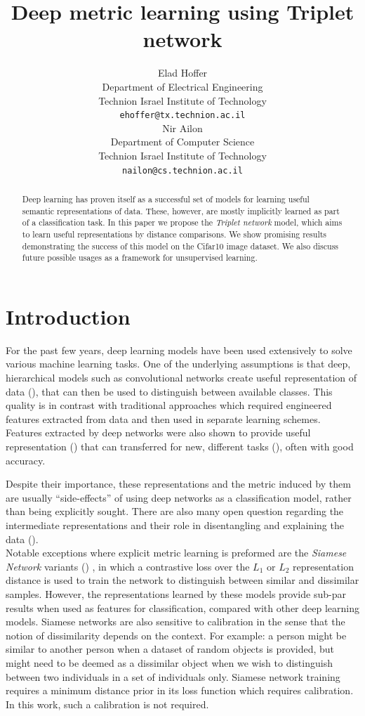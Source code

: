 \documentclass{article} %
\title{Deep metric learning using Triplet network}
\author{
Elad Hoffer \\
Department of Electrical Engineering\\
Technion Israel Institute of Technology\\
\texttt{ehoffer@tx.technion.ac.il} \\
\And
Nir Ailon \\
Department of Computer Science\\
Technion Israel Institute of Technology\\
\texttt{nailon@cs.technion.ac.il}
}
\begin{document}
\maketitle

\begin{abstract}
Deep learning has proven itself as a successful set of models for learning useful semantic representations of data. These, however, are mostly implicitly learned as part of a classification task.
In this paper we propose the \emph{Triplet network} model, which aims to learn useful representations by distance comparisons. We show promising results demonstrating the
success of this model on the Cifar10 image dataset. We also discuss future possible usages as a framework for unsupervised learning.
\end{abstract}


\section{Introduction}
For the past few years, deep learning models have been used extensively to solve various machine learning tasks. One of the underlying assumptions is that deep, hierarchical models such as convolutional networks
create useful representation of data (\citet{Bengio2009,Hinton2007}), that can then be used to distinguish between available classes.
This quality is in contrast with traditional approaches which required engineered features extracted from data and then used in separate learning schemes.\\
Features extracted by deep networks were also shown to provide useful representation (\citet{Zeiler2013,Sermanet}) that can transferred for new, different tasks (\citet{Razavian2014}), often with good accuracy.

Despite their importance, these representations and the metric induced by them are usually ``side-effects'' of using deep networks as a classification model, rather than being explicitly sought.
There are also many open question regarding the intermediate representations and their role in disentangling and explaining the data (\citet{Bengio2013}).\\
Notable exceptions where explicit metric learning is preformed are the \emph{Siamese Network} variants (\citet{bromley1993signature,Chopra2005,hadsell2006dimensionality})
, in which a contrastive loss over the $L_1$ or $L_2$ representation distance is used to train the network to distinguish between similar and dissimilar samples.
However, the representations learned by these models provide sub-par results when used as features for classification, compared with other deep learning models. Siamese networks are also sensitive to calibration in the sense that the notion of dissimilarity depends on the context.
For example: a person might be similar to another person when a dataset of random objects is provided, but might need to be deemed as a dissimilar object when we wish to distinguish between two individuals in a set of individuals only. Siamese network training requires a minimum distance prior in its loss function which requires calibration.
In this work, such a calibration is not required.\\
\end{document}
